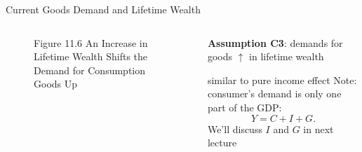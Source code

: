 \documentclass[11pt,aspectratio=169,usenames,dvipsnames]{beamer}
\let\tempone\itemize
\let\temptwo\enditemize
\renewenvironment{itemize}{\tempone\addtolength{\itemsep}{\fill}}{\temptwo}
\begin{document}
\begin{frame}{Current Goods Demand and Lifetime Wealth}
\label{slide:Current_Goods_Demand_and_Lifetime_Wealth}
    \begin{columns}
        \begin{column}{0.5\textwidth}
            \begin{figure}
                \caption{\scriptsize Figure 11.6  An Increase in Lifetime Wealth Shifts the Demand for Consumption Goods Up}
            \end{figure}
        \end{column}
        \begin{column}{0.5\textwidth}
            \textbf{Assumption C3}: demands for goods $ \uparrow  $ in lifetime wealth
            \begin{itemize}
                \item similar to pure income effect
            \end{itemize}
            Note: consumer's demand is only one part of the GDP:
            \begin{equation*}
               Y = C + I + G
            .\end{equation*}
            We'll discuss $ I $ and $ G $ in next lecture

        \end{column}
    \end{columns}
\end{frame}
\end{document}
